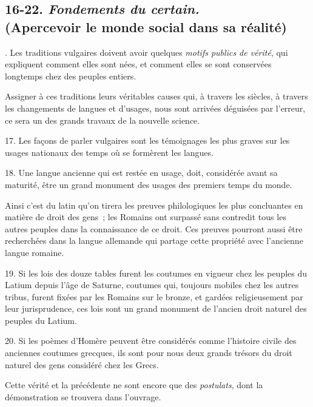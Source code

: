 \documentclass[french,twoside]{book} %
\begin{document}
\subsection[{16-22. Fondements du certain. (Apercevoir le monde social dans sa réalité)}]{16-22. {\itshape Fondements du certain. }\\
(Apercevoir le monde social dans sa réalité)}
. Les traditions vulgaires doivent avoir quelques {\itshape motifs publics de vérité}, qui expliquent comment elles sont nées, et comment elles se sont conservées longtemps chez des peuples entiers.\par
Assigner à ces traditions leurs véritables causes qui, à travers les siècles, à travers les changements de langues et d’usages, nous sont arrivées déguisées  par l’erreur, ce sera un des grands travaux de la nouvelle science.\par
17. Les façons de parler vulgaires sont les témoignages les plus graves sur les usages nationaux des temps où se formèrent les langues.\par
18. Une langue ancienne qui est restée en usage, doit, considérée avant sa maturité, être un grand monument des usages des premiers temps du monde.\par
Ainsi c’est du latin qu’on tirera les preuves philologiques les plus concluantes en matière de droit des gens ; les Romains ont surpassé sans contredit tous les autres peuples dans la connaissance de ce droit. Ces preuves pourront aussi être recherchées dans la langue allemande qui partage cette propriété avec l’ancienne langue romaine.\par
19. Si les lois des douze tables furent les coutumes en vigueur chez les peuples du Latium depuis l’âge de Saturne, coutumes qui, toujours mobiles chez les autres tribus, furent fixées par les Romains sur le bronze, et gardées religieusement par leur jurisprudence, ces lois sont un grand monument de l’ancien droit naturel des peuples du Latium.\par
20. Si les poèmes d’Homère peuvent être considérés comme l’histoire civile des anciennes coutumes grecques, ils sont pour nous deux grands trésors  du droit naturel des gens considéré chez les Grecs.\par
Cette vérité et la précédente ne sont encore que des {\itshape postulats}, dont la démonstration se trouvera dans l’ouvrage.\par
\end{document}
